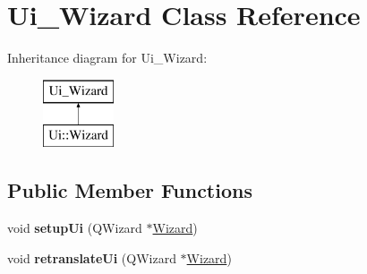 \hypertarget{class_ui___wizard}{}\section{Ui\+\_\+\+Wizard Class Reference}
\label{class_ui___wizard}
Inheritance diagram for Ui\+\_\+\+Wizard\+:\begin{figure}[H]
\begin{center}
\leavevmode
\includegraphics[height=2.000000cm]{class_ui___wizard}
\end{center}
\end{figure}
\subsection*{Public Member Functions}
\begin{DoxyCompactItemize}
\item 
\hypertarget{class_ui___wizard_a3da6248185e41358014012105bd59c56}{}void {\bfseries setup\+Ui} (Q\+Wizard $\ast$\hyperlink{class_wizard}{Wizard})\label{class_ui___wizard_a3da6248185e41358014012105bd59c56}

\item 
\hypertarget{class_ui___wizard_a123484236c302371968f46976bbdf2d7}{}void {\bfseries retranslate\+Ui} (Q\+Wizard $\ast$\hyperlink{class_wizard}{Wizard})\label{class_ui___wizard_a123484236c302371968f46976bbdf2d7}

\end{DoxyCompactItemize}
